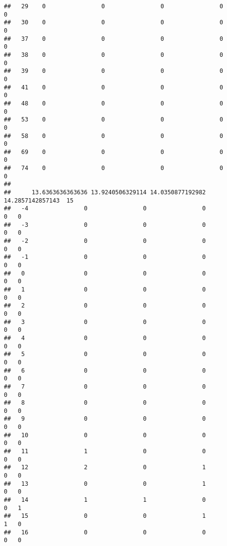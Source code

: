 \documentclass[]{article}
\begin{document}
\begin{verbatim}
##   29    0                0                0                0                0
##   30    0                0                0                0                0
##   37    0                0                0                0                0
##   38    0                0                0                0                0
##   39    0                0                0                0                0
##   41    0                0                0                0                0
##   48    0                0                0                0                0
##   53    0                0                0                0                0
##   58    0                0                0                0                0
##   69    0                0                0                0                0
##   74    0                0                0                0                0
##     
##      13.6363636363636 13.9240506329114 14.0350877192982 14.2857142857143  15
##   -4                0                0                0                0   0
##   -3                0                0                0                0   0
##   -2                0                0                0                0   0
##   -1                0                0                0                0   0
##   0                 0                0                0                0   0
##   1                 0                0                0                0   0
##   2                 0                0                0                0   0
##   3                 0                0                0                0   0
##   4                 0                0                0                0   0
##   5                 0                0                0                0   0
##   6                 0                0                0                0   0
##   7                 0                0                0                0   0
##   8                 0                0                0                0   0
##   9                 0                0                0                0   0
##   10                0                0                0                0   0
##   11                1                0                0                0   0
##   12                2                0                1                0   0
##   13                0                0                1                0   0
##   14                1                1                0                0   1
##   15                0                0                1                1   0
##   16                0                0                0                0   0

\end{verbatim}
\end{document}
